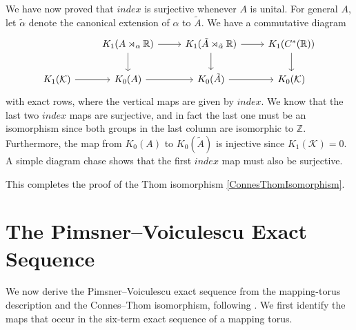 \documentclass{book}
\begin{document}
We have now proved that \(index\) is surjective whenever \(A\) is unital. For general \(A\), let \(\tilde{\alpha}\) denote the canonical extension of \(\alpha\) to \(\tilde{A}\). We have a commutative diagram
\[
  \begin{tikzcd}
    &K_1(A\rtimes_\alpha\mathbb{R})\arrow[r]\arrow[d]&K_1(\tilde{A}\rtimes_{\tilde{\alpha}}\mathbb{R})\arrow[r]\arrow[d]&K_1(C^*(\mathbb{R}))\arrow[d]\\
    K_1(\mathcal{K})\arrow[r]&K_0(A)\arrow[r]&K_0(\tilde{A})\arrow[r]&K_0(\mathcal{K})
  \end{tikzcd}
\]
with exact rows, where the vertical maps are given by \(index\). We know that the last two \(index\) maps
are surjective, and in fact the last one must be an isomorphism since both groups in the last column are isomorphic to \(\mathbb{Z}\).
Furthermore, the map from \(K_0(A)\) to \(K_0(\tilde{A})\) is injective since \(K_1(\mathcal{K})=0\).
A simple diagram chase shows that the first \(index\) map must also be surjective.\par
This completes the proof of the Thom isomorphism \ref{ConnesThomIsomorphism}.

\section{The Pimsner--Voiculescu Exact Sequence}

We now derive the Pimsner--Voiculescu exact sequence from the mapping-torus
description and the Connes--Thom isomorphism, following
\cite[Section~10.4]{Blackadar1998}. We first identify the maps that occur in
the six-term exact sequence of a mapping torus.
\end{document}
